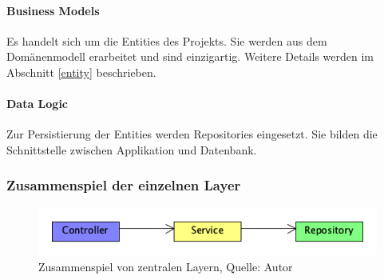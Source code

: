 \paragraph{Business Models}
Es handelt sich um die Entities des Projekts. Sie werden aus dem Domänenmodell erarbeitet und sind einzigartig. Weitere Details werden im Abschnitt \ref{entity} beschrieben. 

\paragraph{Data Logic}
Zur Persistierung der Entities werden Repositories eingesetzt. Sie bilden die Schnittstelle zwischen Applikation und Datenbank. 
\newpage
\subsubsection{Zusammenspiel der einzelnen Layer}
\begin{figure}[H]
	\centering
	\includegraphics[width=\linewidth]{images/springFlow.png}
	\caption[Zusammenspiel von zentralen Layern]{Zusammenspiel von zentralen Layern, Quelle: Autor}
	\label{img: layer}
\end{figure}

